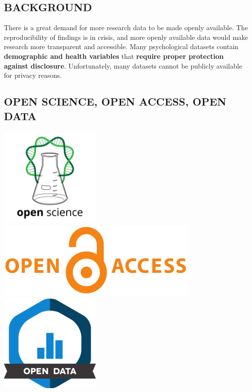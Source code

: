 \documentclass[a0,portrait]{a0poster}
\begin{document}
\begin{multicols}{3} %

\Large
\section{BACKGROUND}

There is a great demand for more research data to be made openly available.
The reproducibility of findings is in crisis, and more openly available data would make research more transparent and accessible.
Many psychological datasets contain \textbf{demographic and health variables} that \textbf{require proper protection against disclosure}.
Unfortunately, many datasets cannot be publicly available for privacy reasons.

\subsection{OPEN SCIENCE, OPEN ACCESS, OPEN DATA}

 \includegraphics[width=5cm]{Poster TEX/style/Open Science.png} 
 \hspace{\fill} 
 \includegraphics[width=10cm]{Poster TEX/style/Open access (4).png}
 \hspace{\fill} 
 \includegraphics[width=5cm]{Poster TEX/style/Open data.png}


\end{multicols}
\end{document}
